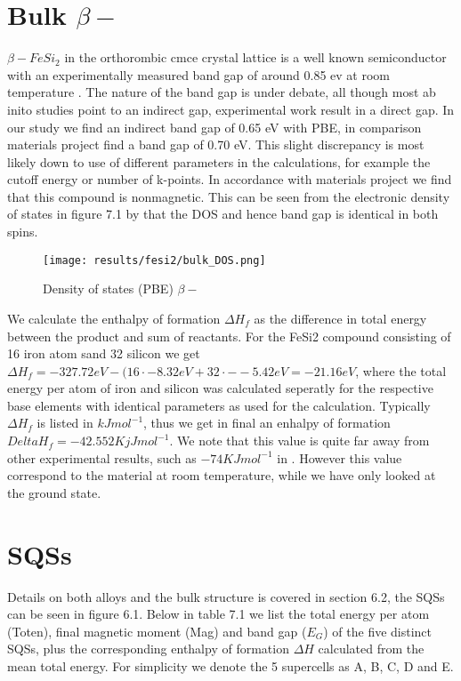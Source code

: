 \section{Bulk $\beta-$ }
$\beta-FeSi_2$ in the orthorombic cmce crystal lattice is a well known semiconductor with an experimentally measured band gap of around 0.85 ev at room temperature \cite{PhysRevB.58.10389}. The nature of the band gap is under debate, all though most ab inito studies point to an indirect gap, experimental work result in a direct gap. In our study we find an indirect band gap of 0.65 eV with PBE, in comparison materials project find a band gap of 0.70 eV. This slight discrepancy is most likely down to use of different parameters in the calculations, for example the cutoff energy or number of k-points. In accordance with materials project we find that this compound is nonmagnetic. This can be seen from the electronic density of states in figure 7.1 by that the DOS and hence band gap is identical in both spins.   

\begin{figure}[H]
\centering
\texttt{[image: results/fesi2/bulk\_DOS.png]}
\caption{Density of states (PBE) $\beta-$ }
\end{figure}

We calculate the enthalpy of formation $\Delta H_f$ as the difference in total energy between the product and sum of reactants. For the FeSi2 compound consisting of 16 iron atom sand 32 silicon we get $\Delta H_f = -327.72 eV - (16 \cdot -8.32 eV + 32 \cdot - -5.42 eV = -21.16 eV$, where the total energy per atom of iron and silicon was calculated seperatly for the respective base elements with identical parameters as used for the  calculation. Typically $\Delta H_f$ is listed in $kJmol^{-1}$, thus we get in final an enhalpy of formation $Delta H_f = - 42.552 KjJmol^{-1}$. We note that this value is quite far away from other experimental results, such as $-74 KJmol^{-1}$ in \cite{entalpi}. However this value correspond to the material at room temperature, while we have only looked at the ground state. 

\section{ SQSs}
Details on both alloys and the bulk  structure is covered in section 6.2, the SQSs can be seen in figure 6.1. Below in table 7.1 we list the total energy per atom (Toten), final magnetic moment (Mag) and band gap ($E_G$) of the five distinct SQSs, plus the corresponding enthalpy of formation $\Delta H$ calculated from the mean total energy. For simplicity we denote the 5 supercells as A, B, C, D and E. 

